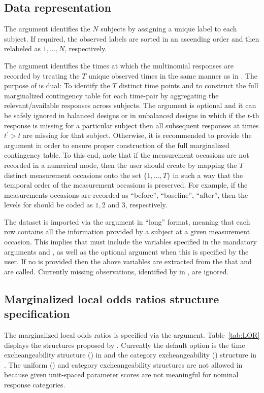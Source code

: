 \documentclass[article,shortnames,nojss]{jss}
\begin{document}
\subsection{Data representation}\label{Data Representation}
The  argument identifies the $N$ subjects by assigning a unique label to each subject. If required, the observed  labels are sorted in an ascending order and then relabeled as $1,\ldots,N$, respectively.

The  argument identifies the times at which the multinomial responses are recorded by treating the $T$ unique observed times in the same manner as in . The purpose of  is dual: To identify the $T$ distinct time points and to construct the full marginalized contingency table for each time-pair by aggregating the relevant/available responses across subjects. The  argument is optional and it can be safely ignored in balanced designs or in unbalanced designs in which if the $t$-th response is missing for a particular subject then all subsequent responses at times $t^{\prime}>t$ are missing for that subject. Otherwise, it is recommended to provide the  argument in order to ensure proper construction of the full marginalized contingency table. To this end, note that if the measurement occasions are not recorded in a numerical mode, then the user should create  by mapping the $T$ distinct measurement occasions onto the set $\{1,\ldots,T\}$ in such a way that the temporal order of the measurement occasions is preserved. For example, if the measurements occasions are recorded as ``before'', ``baseline'', ``after'', then the levels for  should be coded as $1,2$ and $3$, respectively. 

The dataset is imported via the  argument in ``long'' format, meaning that each row contains all the information provided by a subject at a given measurement occasion. This implies that  must include the variables specified in the mandatory arguments  and , as well as the optional argument  when this is specified by the user. If no  is provided then the above variables are extracted from the  that  and  are called. Currently missing observations, identified by  in , are ignored.

\subsection{Marginalized local odds ratios structure specification} 
The marginalized local odds ratios is specified via the  argument. Table~\ref{tab:LOR} displays the structures proposed by \cite{Touloumis2012}. Currently the default option is the time excheangeability structure () in  and the category excheangeability () structure in . The uniform () and category excheangeability structures are not allowed in  because given unit-spaced parameter scores are not meaningful for nominal response categories.
\end{document}

